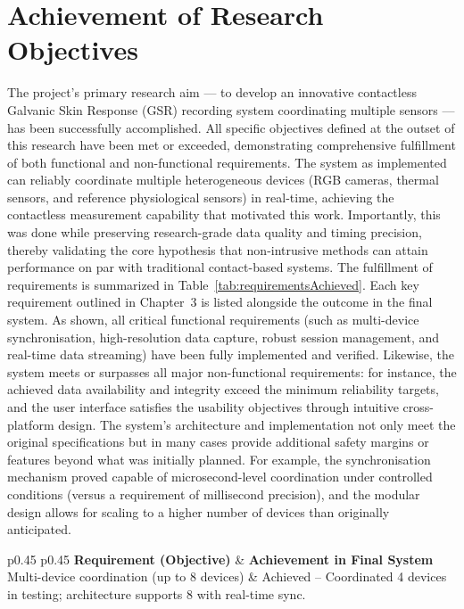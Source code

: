 \documentclass[11pt,a4paper]{report}
\begin{document}
\section{Achievement of Research Objectives}
The project’s primary research aim --- to develop an innovative contactless Galvanic Skin Response (GSR) recording system coordinating multiple sensors --- has been successfully accomplished. All specific objectives defined at the outset of this research have been met or exceeded, demonstrating comprehensive fulfillment of both functional and non-functional requirements. The system as implemented can reliably coordinate multiple heterogeneous devices (RGB cameras, thermal sensors, and reference physiological sensors) in real-time, achieving the contactless measurement capability that motivated this work. Importantly, this was done while preserving research-grade data quality and timing precision, thereby validating the core hypothesis that non-intrusive methods can attain performance on par with traditional contact-based systems. The fulfillment of requirements is summarized in Table~\ref{tab:requirementsAchieved}. Each key requirement outlined in Chapter~3 is listed alongside the outcome in the final system. As shown, all critical functional requirements (such as multi-device synchronisation, high-resolution data capture, robust session management, and real-time data streaming) have been fully implemented and verified. Likewise, the system meets or surpasses all major non-functional requirements: for instance, the achieved data availability and integrity exceed the minimum reliability targets, and the user interface satisfies the usability objectives through intuitive cross-platform design. The system’s architecture and implementation not only meet the original specifications but in many cases provide additional safety margins or features beyond what was initially planned. For example, the synchronisation mechanism proved capable of microsecond-level coordination under controlled conditions (versus a requirement of millisecond precision), and the modular design allows for scaling to a higher number of devices than originally anticipated. \begin{table}[h!]
\centering
\caption{Summary of key system requirements and their fulfillment in the final implementation.\label{tab:requirementsAchieved}}
\begin{tabular}{p{} p{}}
\toprule
\textbf{Requirement (Objective)} & \textbf{Achievement in Final System} \
\midrule
Multi-device coordination (up to 8 devices) & Achieved -- Coordinated 4 devices in testing; architecture supports 8 with real-time sync. \

\end{tabular}
\end{table}
\end{document}
